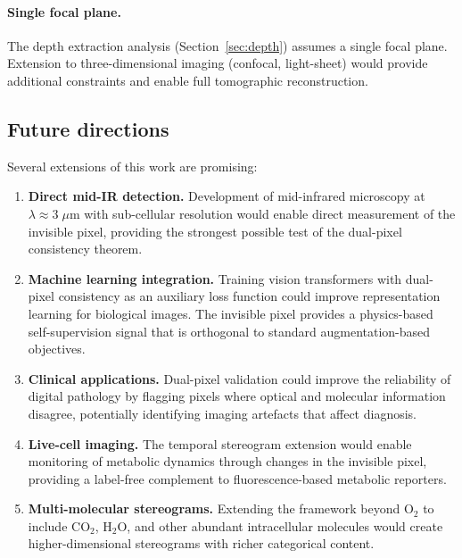 \documentclass[11pt,twocolumn,a4paper]{article}
\begin{document}
\paragraph{Single focal plane.}
The depth extraction analysis (Section~\ref{sec:depth}) assumes a single focal plane.
Extension to three-dimensional imaging (confocal, light-sheet) would provide additional constraints and enable full tomographic reconstruction.

\subsection{Future directions}

Several extensions of this work are promising:

\begin{enumerate}
\item \textbf{Direct mid-IR detection.} Development of mid-infrared microscopy at $\lambda \approx 3\;\mu$m with sub-cellular resolution would enable direct measurement of the invisible pixel, providing the strongest possible test of the dual-pixel consistency theorem.

\item \textbf{Machine learning integration.} Training vision transformers with dual-pixel consistency as an auxiliary loss function could improve representation learning for biological images.
The invisible pixel provides a physics-based self-supervision signal that is orthogonal to standard augmentation-based objectives.

\item \textbf{Clinical applications.} Dual-pixel validation could improve the reliability of digital pathology by flagging pixels where optical and molecular information disagree, potentially identifying imaging artefacts that affect diagnosis.

\item \textbf{Live-cell imaging.} The temporal stereogram extension would enable monitoring of metabolic dynamics through changes in the invisible pixel, providing a label-free complement to fluorescence-based metabolic reporters.

\item \textbf{Multi-molecular stereograms.} Extending the framework beyond O$_2$ to include CO$_2$, H$_2$O, and other abundant intracellular molecules would create higher-dimensional stereograms with richer categorical content.
\end{enumerate}
\end{document}
